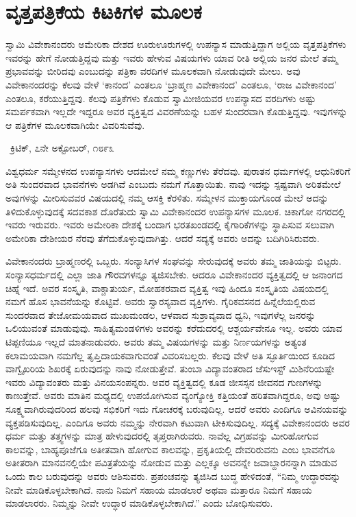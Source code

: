
\chapter{ವೃತ್ತಪತ್ರಿಕೆಯ ಕಿಟಕಿಗಳ ಮೂಲಕ}

ಸ್ವಾಮಿ ವಿವೇಕಾನಂದರು ಅಮೇರಿಕಾ ದೇಶದ ಊರುಊರುಗಳಲ್ಲಿ ಉಪನ್ಯಾಸ ಮಾಡುತ್ತಿದ್ದಾಗ ಅಲ್ಲಿಯ ವೃತ್ತಪತ್ರಿಕೆಗಳು ಇವರನ್ನು ಹೇಗೆ ನೋಡುತ್ತಿದ್ದವು ಮತ್ತು ಇವರು ಹೇಳುವ ವಿಷಯಗಳು ಯಾವ ರೀತಿ ಅಲ್ಲಿಯ ಜನರ ಮೇಲೆ ತಮ್ಮ ಪ್ರಭಾವವನ್ನು ಬೀರಿದವು ಎಂಬುದನ್ನು ಪತ್ರಿಕಾ ವರದಿಗಳ ಮೂಲಕವಾಗಿ ನೋಡುವುದೇ ಮೇಲು. ಅವು ವಿವೇಕಾನಂದರನ್ನು ಕೆಲವು ವೇಳೆ ‘ಕಾನಂದ’ ಎಂತಲೂ ‘ಬ್ರಾಹ್ಮಣ ವಿವೇಕಾನಂದ’ ಎಂತಲೂ, ‘ರಾಜ ವಿವೇಕಾನಂದ’ ಎಂತಲೂ, ಕರೆಯುತ್ತಿದ್ದವು. ಕೆಲವು ಪತ್ರಿಕೆಗಳು ಕೊಡುವ ಸ್ವಾಮೀಜಿಯವರ ಉಪನ್ಯಾಸದ ವರದಿಗಳು ಅಷ್ಟು ಸಮರ್ಪಕವಾಗಿ ಇಲ್ಲದೇ ಇದ್ದರೂ ಅವರ ವ್ಯಕ್ತಿತ್ವದ ವಿವರಣೆಯನ್ನು ಬಹಳ ಸುಂದರವಾಗಿ ಕೊಡುತ್ತಿದ್ದವು. ಇವುಗಳನ್ನು ಆ ಪತ್ರಿಕೆಗಳ ಮೂಲಕವಾಗಿಯೇ ವಿವರಿಸುವೆವು.

~\hfill{\fontsize{11pt}{13.75pt}\selectfont ಕ್ರಿಟಿಕ್, ೭ನೇ ಅಕ್ಟೋಬರ್, ೧೮೯೩}

 ವಿಶ್ವಧರ್ಮ ಸಮ್ಮೇಳನದ ಉಪನ್ಯಾಸಗಳು ಆದಮೇಲೆ ನಮ್ಮ ಕಣ್ಣುಗಳು ತೆರೆದವು. ಪುರಾತನ ಧರ್ಮಗಳಲ್ಲಿ ಆಧುನಿಕರಿಗೆ ಅತಿ ಸುಂದರವಾದ ಭಾವನೆಗಳು ಅಡಗಿವೆ ಎಂಬುದು ನಮಗೆ ಗೊತ್ತಾಯಿತು. ನಾವು ಇದನ್ನು ಸ್ಪಷ್ಟವಾಗಿ ಅರಿತಮೇಲೆ ಅವುಗಳನ್ನು ಮೀರಿಸುವವರ ವಿಷಯದಲ್ಲಿ ನಮ್ಮ ಆಸಕ್ತಿ ಕೆರಳಿತು. ಸಮ್ಮೇಳನ ಮುಕ್ತಾಯಗೊಂಡ ಮೇಲೆ ಅದನ್ನು ತಿಳಿದುಕೊಳ್ಳುವುದಕ್ಕೆ ಸದವಕಾಶ ದೊರೆತುದು ಸ್ವಾಮಿ ವಿವೇಕಾನಂದರ ಉಪನ್ಯಾಸಗಳ ಮೂಲಕ. ಚಿಕಾಗೋ ನಗರದಲ್ಲಿ ಇವರು ಇರುವರು. ಇವರು ಅಮೇರಿಕಾ ದೇಶಕ್ಕೆ ಬಂದಾಗ ಭರತಖಂಡದಲ್ಲಿ ಕೈಗಾರಿಕೆಗಳನ್ನು ಸ್ಥಾಪಿಸುವ ಸಲುವಾಗಿ ಅಮೇರಿಕಾ ದೇಶೀಯರ ನೆರವು ತೆಗೆದುಕೊಳ್ಳುವುದಾಗಿತ್ತು. ಆದರೆ ಸದ್ಯಕ್ಕೆ ಅವರು ಅದನ್ನು ಬದಿಗಿರಿಸಿರುವರು. 

 ವಿವೇಕಾನಂದರು ಬ್ರಾಹ್ಮಣರಲ್ಲಿ ಒಬ್ಬರು. ಸಂನ್ಯಾಸಿಗಳ ಸಂಘವನ್ನು ಸೇರುವುದಕ್ಕೆ ಅವರು ತಮ್ಮ ಜಾತಿಯನ್ನು ಬಿಟ್ಟರು. ಸಂನ್ಯಾಸಧರ್ಮದಲ್ಲಿ ಎಲ್ಲಾ ಜಾತಿ ಗೌರವಗಳನ್ನೂ ತ್ಯಜಿಸಬೇಕು. ಆದರೂ ವಿವೇಕಾನಂದರ ವ್ಯಕ್ತಿತ್ವದಲ್ಲಿ ಆ ಜನಾಂಗದ ಚಿಹ್ನೆ ಇದೆ. ಅವರ ಸಂಸ್ಕೃತಿ, ವಾಕ್ಚಾತುರ್ಯ, ಮೋಹಕರವಾದ ವ್ಯಕ್ತಿತ್ವ ಇವು ಹಿಂದೂ ಸಂಸ್ಕೃತಿಯ ವಿಷಯದಲ್ಲಿ ನಮಗೆ ಹೊಸ ಭಾವನೆಯನ್ನು ಕೊಟ್ಟಿವೆ. ಅವರು ಸ್ವಾರಸ್ಯವಾದ ವ್ಯಕ್ತಿಗಳು. ಗೈರಿಕವಸನದ ಹಿನ್ನೆಲೆಯಲ್ಲಿರುವ ಸುಂದರವಾದ ತೇಜೋಮಯವಾದ ಮುಖಮಂಡಲ, ಆಳವಾದ ಸುಶ್ರಾವ್ಯವಾದ ಧ್ವನಿ, ಇವುಗಳೆಲ್ಲ ಜನರನ್ನು ಒಲಿಯುವಂತೆ ಮಾಡುವುವು. ಸಾಹಿತ್ಯಮಂಡಳಿಗಳು ಅವರನ್ನು ಕರೆದುದರಲ್ಲಿ ಆಶ್ಚರ್ಯವೇನೂ ಇಲ್ಲ. ಅವರು ಯಾವ ಟಿಪ್ಪಣಿಯೂ ಇಲ್ಲದೆ ಮಾತನಾಡುವರು. ಅವರು ತಮ್ಮ ವಿಷಯಗಳನ್ನು ಮತ್ತು ನಿರ್ಣಯಗಳನ್ನು ಅತ್ಯಂತ ಕಲಾಮಯವಾಗಿ ನಮಗೆಲ್ಲ ತೃಪ್ತಿದಾಯಕವಾಗುವಂತೆ ವಿವರಿಸಬಲ್ಲರು. ಕೆಲವು ವೇಳೆ ಅತಿ ಸ್ಫೂರ್ತಿಯಿಂದ ಕೂಡಿದ ವಾಗ್ವೈಖರಿಯ ಶಿಖರಕ್ಕೆ ಏರುವುದನ್ನು ನಾವು ನೋಡುತ್ತೇವೆ. ತುಂಬಾ ವಿದ್ಯಾವಂತರಾದ ಜೆಸುಇಸ್ಟ್ ಮಿಶಿನೆರಿಯಷ್ಟೇ ಇವರು ವಿದ್ಯಾವಂತರು ಮತ್ತು ವಿನಯಸಂಪನ್ನರು. ಅವರ ವ್ಯಕ್ತಿತ್ವದಲ್ಲಿ ಕೂಡ ಜೀಸಸ್ಸನ ಜೀವನದ ಗುಣಗಳನ್ನು ಕಾಣುತ್ತೇವೆ. ಅವರು ಮಾತಿನ ಮಧ್ಯದಲ್ಲಿ ಉಪಯೋಗಿಸುವ ವ್ಯಂಗ್ಯೋಕ್ತಿ ಕತ್ತಿಯಂತೆ ಹರಿತವಾಗಿದ್ದರೂ, ಅವು ಅಷ್ಟು ಸೂಕ್ಷ್ಮವಾಗಿರುವುದರಿಂದ ಹಲವು ಸಭಿಕರಿಗೆ ಇದು ಗೋಚರಕ್ಕೆ ಬರುವುದಿಲ್ಲ. ಆದರೆ ಅವರು ಎಂದಿಗೂ ಅವಿನಯವನ್ನು ವ್ಯಕ್ತಪಡಿಸುವುದಿಲ್ಲ. ಎಂದಿಗೂ ಅವರು ನಮ್ಮನ್ನು ನೇರವಾಗಿ ಕಟುವಾಗಿ ಟೀಕಿಸುವುದಿಲ್ಲ. ಸದ್ಯಕ್ಕೆ ವಿವೇಕಾನಂದರು ಅವರ ಧರ್ಮ ಮತ್ತು ತತ್ತ್ವಗಳನ್ನು ಮಾತ್ರ ಹೇಳುವುದರಲ್ಲಿ ತೃಪ್ತರಾಗಿರುವರು. ನಾವೆಲ್ಲ ವಿಗ್ರಹವನ್ನು ಮೀರಿಹೋಗುವ ಕಾಲವನ್ನು, ಬಾಹ್ಯಪೂಜೆಗೂ ಅತೀತವಾಗಿ ಹೋಗುವ ಕಾಲವನ್ನು, ಪ್ರಕೃತಿಯಲ್ಲಿ ದೇವರಿರುವನು ಎಂಬ ಭಾವನೆಗೂ ಅತೀತರಾಗಿ ಮಾನವನಲ್ಲಿಯೇ ಪವಿತ್ರತೆಯನ್ನು ನೋಡುವ ಮತ್ತು ಎಲ್ಲಕ್ಕೂ ಅವನನ್ನೇ ಜವಾಬ್ದಾರನನ್ನಾಗಿ ಮಾಡುವ ಒಂದು ಕಾಲ ಬರುವುದನ್ನು ಅವರು ಆಶಿಸುವರು. ಪ್ರಪಂಚವನ್ನು ತ್ಯಜಿಸಿದ ಬುದ್ಧ ಹೇಳಿದಂತೆ, “ನಿಮ್ಮ ಉದ್ಧಾರವನ್ನು ನೀವೇ ಮಾಡಿಕೊಳ್ಳಬೇಕಾಗಿದೆ. ನಾನು ನಿಮಗೆ ಸಹಾಯ ಮಾಡಲಾರೆ ಅಥವಾ ಮತ್ತಾರೂ ನಿಮಗೆ ಸಹಾಯ ಮಾಡಲಾರರು. ನಿಮ್ಮನ್ನು ನೀವೇ ಉದ್ಧಾರ ಮಾಡಿಕೊಳ್ಳಬೇಕಾಗಿದೆ.” ಎಂದು ಬೋಧಿಸುವರು.

